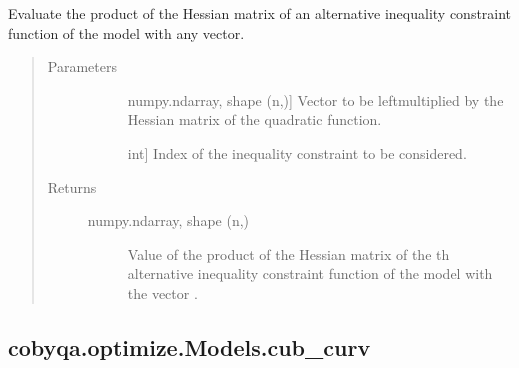 \documentclass[letterpaper,10pt,english]{sphinxmanual}
\begin{document}
\begin{fulllineitems}
\begin{fulllineitems}
\label{\detokenize{refs/generated/cobyqa.optimize.Models.cub_alt_hessp:cobyqa.optimize.Models.cub_alt_hessp}}
\sphinxAtStartPar
Evaluate the product of the Hessian matrix of an alternative inequality
constraint function of the model with any vector.
\begin{quote}\begin{description}
\item[{Parameters}] \leavevmode\begin{description}
\item[{}] \leavevmode{[}numpy.ndarray, shape (n,){]}
\sphinxAtStartPar
Vector to be left\sphinxhyphen{}multiplied by the Hessian matrix of the quadratic
function.

\item[{}] \leavevmode{[}int{]}
\sphinxAtStartPar
Index of the inequality constraint to be considered.

\end{description}

\item[{Returns}] \leavevmode\begin{description}
\item[{numpy.ndarray, shape (n,)}] \leavevmode
\sphinxAtStartPar
Value of the product of the Hessian matrix of the \sphinxhyphen{}th alternative
inequality constraint function of the model with the vector .

\end{description}

\end{description}\end{quote}

\end{fulllineitems}



\subsection{cobyqa.optimize.Models.cub\_curv}
\label{\detokenize{refs/generated/cobyqa.optimize.Models.cub_curv:cobyqa-optimize-models-cub-curv}}\label{\detokenize{refs/generated/cobyqa.optimize.Models.cub_curv::doc}}


\end{fulllineitems}
\end{document}
